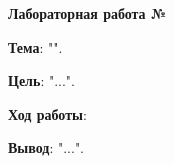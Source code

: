 \begin{center}
    \textbf{Лабораторная работа №\titlePageLabNumber}
\end{center}

\textbf{Тема}: "\titlePageTopic".

\textbf{Цель}: "...".

\textbf{Ход работы}:









\textbf{Вывод}: "...".
